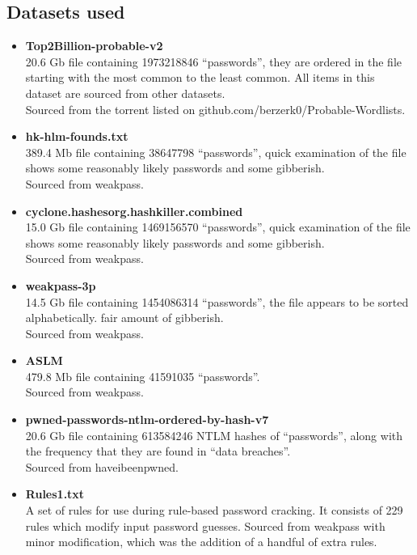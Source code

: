 \documentclass[11pt]{article}
\begin{document}
\subsection{Datasets used} \label{datasets}
\begin{itemize}
\item \textbf{Top2Billion-probable-v2}\\
20.6 Gb file containing 1973218846 ``passwords'', they are ordered in the file starting with the most common to the least common. All items in this dataset are sourced from other datasets.\\
Sourced from the torrent listed on github.com/berzerk0/Probable-Wordlists.
\item \textbf{hk-hlm-founds.txt}\\
389.4 Mb file containing 38647798 ``passwords'', quick examination of the file shows some reasonably likely passwords and some gibberish.\\
Sourced from weakpass.
\item \textbf{cyclone.hashesorg.hashkiller.combined}\\
15.0 Gb file containing 1469156570 ``passwords'', quick examination of the file shows some reasonably likely passwords and some gibberish.\\
Sourced from weakpass.
\item \textbf{weakpass-3p}\\
14.5 Gb file containing 1454086314 ``passwords'', the file appears to be sorted alphabetically. fair amount of gibberish.\\
Sourced from weakpass.
\item \textbf{ASLM}\\
479.8 Mb file containing 41591035 ``passwords''.\\
Sourced from weakpass.
\item \textbf{pwned-passwords-ntlm-ordered-by-hash-v7}\\
20.6 Gb file containing 613584246 NTLM hashes of ``passwords'', along with the frequency that they are found in ``data breaches''.\\
Sourced from haveibeenpwned.
\item \textbf{Rules1.txt}\\
A set of rules for use during rule-based password cracking. It consists of 229 rules which modify input password guesses.
Sourced from weakpass with minor modification, which was the addition of a handful of extra rules.
\end{itemize}
\end{document}
